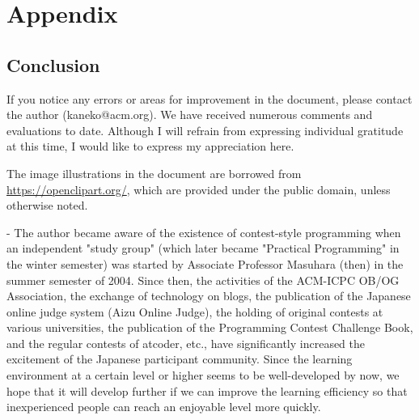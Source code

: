 \documentclass[report]{book}
\begin{document}


\part{Appendix}

\begin{versionoutside}
\chapter{Conclusion}
If you notice any errors or areas for improvement in the document, please contact the author (kaneko@acm.org). We have received numerous comments and evaluations to date. Although I will refrain from expressing individual gratitude at this time, I would like to express my appreciation here.

The image illustrations in the document are borrowed from \url{https://openclipart.org/}, which are provided under the public domain, unless otherwise noted.

\vfill

\begin{itembox}[r]{-}
The author became aware of the existence of contest-style programming when an independent "study group" (which later became "Practical Programming" in the winter semester) was started by Associate Professor Masuhara (then) in the summer semester of 2004. Since then, the activities of the ACM-ICPC OB/OG Association, the exchange of technology on blogs, the publication of the Japanese online judge system (Aizu Online Judge), the holding of original contests at various universities, the publication of the Programming Contest Challenge Book, and the regular contests of atcoder, etc., have significantly increased the excitement of the Japanese participant community. Since the learning environment at a certain level or higher seems to be well-developed by now, we hope that it will develop further if we can improve the learning efficiency so that inexperienced people can reach an enjoyable level more quickly.
\end{itembox}
\end{versionoutside}


\appendix
 
\end{document}

